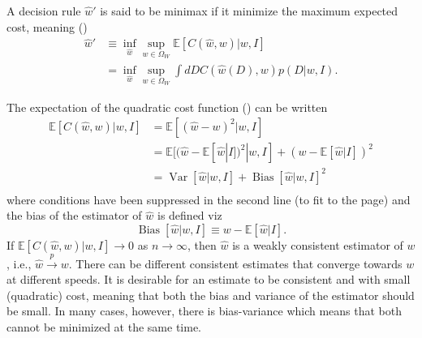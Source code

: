 \begin{definition}
	\label{def:minimax}
	A decision rule $\hat{w}'$ is said to be minimax if it minimize the maximum expected cost, meaning ()
	\begin{equation}
		\begin{split}
			\hat{w}' &\equiv \inf_{\hat{w}}\sup_{w\in \Omega_W}\mathbb{E}[C(\hat{w},w)|w,I]\\
			& = \inf_{\hat{w}}\sup_{w\in \Omega_W}\int dD  C(\hat{w}(D),w) p(D|w,I).
		\end{split}
	\end{equation}
\end{definition}


\begin{theorem}
	\label{theorem:MSE}
	The expectation of the quadratic cost function () can be written
	\begin{equation}
		\begin{split}
			\mathbb{E}[C(\hat{w}, w)|w,I] &= \mathbb{E}[(\hat{w}-w)^2|w,I]\\ 
			&= \mathbb{E}[(\hat{w}-\mathbb{E}[\hat{w}|I])^2|w,I]+(w-\mathbb{E}[\hat{w}|I])^2\\
			&=\operatorname{Var}[\hat{w}|w,I]+\operatorname{Bias}[\hat{w}|w,I]^2\\
		\end{split}
		\label{eq:MSE}
	\end{equation}
	where conditions have been suppressed in the second line (to fit to the page) and the bias of the estimator of $\hat{w}$ is defined viz
	\begin{equation}
		\operatorname{Bias}[\hat{w}|w,I]\equiv w-\mathbb{E}[\hat{w}|I].
	\end{equation}
	If $\mathbb{E}[C(\hat{w}, w)|w,I] \to 0$ as $n \to \infty$, then $\hat{w}$ is a weakly consistent estimator of $w$, i.e., $\hat{w} \xrightarrow{p} w$. There can be different consistent estimates that converge towards $w$ at different speeds. It is desirable for an estimate to be consistent and with small (quadratic) cost, meaning that both the bias and variance of the estimator should be small. In many cases, however, there is bias-variance which means that both cannot be minimized at the same time. 
\end{theorem}

